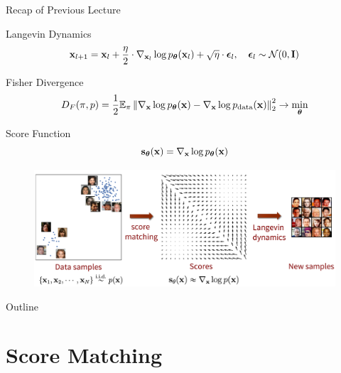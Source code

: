 \documentclass{beamer}
\begin{document}
\begin{frame}{Recap of Previous Lecture}
		\vspace{-0.3cm}
	\begin{block}{Langevin Dynamics}
		\vspace{-0.3cm}
		\[
			\mathbf{x}_{l + 1} = \mathbf{x}_l + \frac{\eta}{2} \cdot \nabla_{\mathbf{x}_l} \log p_{\boldsymbol{\theta}}(\mathbf{x}_l) + \sqrt{\eta} \cdot \boldsymbol{\epsilon}_l, \quad \boldsymbol{\epsilon}_l \sim \mathcal{N}(0, \mathbf{I})
		\]
		\vspace{-0.7cm}
	\end{block}
	\begin{block}{Fisher Divergence}
		\vspace{-0.3cm}
		\[
			D_F(\pi, p) = \frac{1}{2}\mathbb{E}_{\pi}\left\| \nabla_{\mathbf{x}}\log p_{\boldsymbol{\theta}}(\mathbf{x}) - \nabla_{\mathbf{x}} \log p_{\text{data}}(\mathbf{x}) \right\|_2^2 \rightarrow \min_{\boldsymbol{\theta}}
		\]
		\vspace{-0.7cm}
	\end{block}
	\begin{block}{Score Function}
		\vspace{-0.5cm}
		 \[
			 \mathbf{s}_{\boldsymbol{\theta}}(\mathbf{x}) = \nabla_{\mathbf{x}}\log p_{\boldsymbol{\theta}}(\mathbf{x})
		 \]
	 \vspace{-0.8cm}
	\end{block}
	\begin{figure}
		\centering
		\includegraphics[width=0.75\linewidth]{figs/smld}
	\end{figure}
\end{frame}
\begin{frame}{Outline}
	\tableofcontents
\end{frame}
\section{Score Matching}
\end{document}
